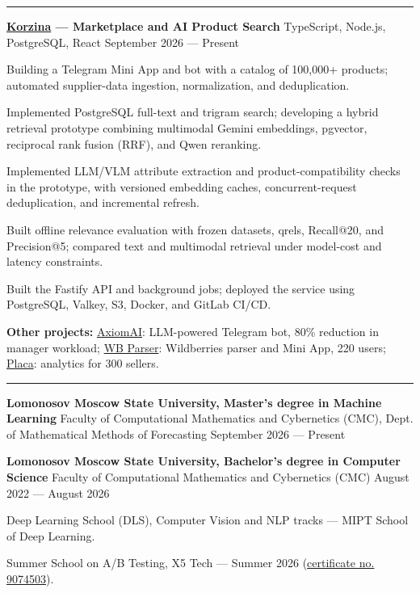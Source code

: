 \documentclass[10pt,a4paper]{article}
\newcommand{\cvsection}[1]{%
  \vspace{5pt}{\large\bfseries #1}\par\vspace{2pt}\hrule\vspace{3pt}}
\newcommand{\cventry}[3]{%
  \textbf{#1} \textbar{} #3 \textbar{} #2\par\vspace{1pt}}
\begin{document}
\cvsection{Projects}
\cventry{\href{https://github.com/noobmaster-ru/korzina-market}{Korzina} --- Marketplace and AI Product Search}{September 2026 --- Present}{TypeScript, Node.js, PostgreSQL, React}
\begin{cvitems}
    \item Building a Telegram Mini App and bot with a catalog of 100,000+ products; automated supplier-data ingestion, normalization, and deduplication.
    \item Implemented PostgreSQL full-text and trigram search; developing a hybrid retrieval prototype combining multimodal Gemini embeddings, pgvector, reciprocal rank fusion (RRF), and Qwen reranking.
    \item Implemented LLM/VLM attribute extraction and product-compatibility checks in the prototype, with versioned embedding caches, concurrent-request deduplication, and incremental refresh.
    \item Built offline relevance evaluation with frozen datasets, qrels, Recall@20, and Precision@5; compared text and multimodal retrieval under model-cost and latency constraints.
    \item Built the Fastify API and background jobs; deployed the service using PostgreSQL, Valkey, S3, Docker, and GitLab CI/CD.
\end{cvitems}
\textbf{Other projects:} \href{https://github.com/noobmaster-ru/axiomai}{AxiomAI}: LLM-powered Telegram bot, 80\% reduction in manager workload; \href{https://github.com/noobmaster-ru/tg-mini-app-backend}{WB Parser}: Wildberries parser and Mini App, 220 users; \href{https://github.com/noobmaster-ru/wb_tables}{Placa}: analytics for 300 sellers.\par

\cvsection{Education}
\cventry{Lomonosov Moscow State University, Master's degree in Machine Learning}{September 2026 --- Present}{Faculty of Computational Mathematics and Cybernetics (CMC), Dept. of Mathematical Methods of Forecasting}
\vspace{2pt}
\cventry{Lomonosov Moscow State University, Bachelor's degree in Computer Science}{August 2022 --- August 2026}{Faculty of Computational Mathematics and Cybernetics (CMC)}
\begin{cvitems}
    \item Deep Learning School (DLS), Computer Vision and NLP tracks --- MIPT School of Deep Learning.
    \item Summer School on A/B Testing, X5 Tech --- Summer 2026 (\href{https://drive.google.com/file/d/1mUnPwkYkO6VxMJelwePo0Ie6PKA6IBot/view?usp=sharing}{certificate no. 9074503}).
\end{cvitems}
\end{document}
